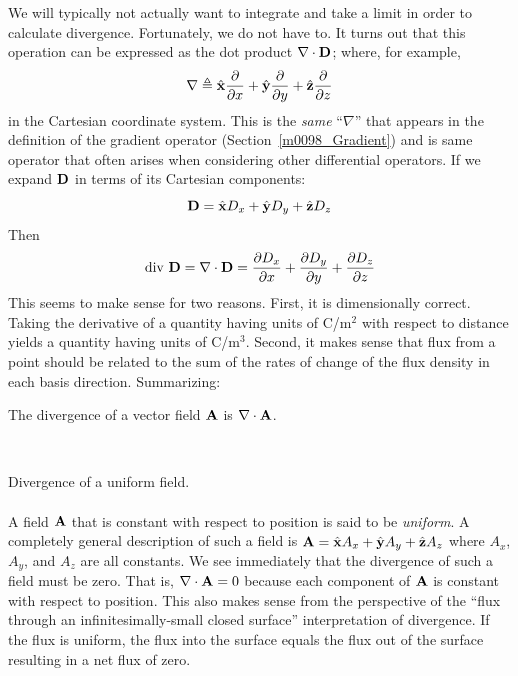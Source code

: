 We will typically not actually want to integrate and take a limit in order to calculate divergence.  
Fortunately, we do not have to.  
It turns out that this operation can be expressed as the dot product $\nabla \cdot {\bf D}$; where, for example,
%
\begin{equation}
\nabla \triangleq \hat{\bf x}\frac{\partial}{\partial x} + \hat{\bf y}\frac{\partial}{\partial y} + \hat{\bf z}\frac{\partial}{\partial z}
\end{equation}
%
in the Cartesian coordinate system.  
This is the \emph{same} ``$\nabla$'' that appears in the definition of the gradient operator (Section~\ref{m0098_Gradient}) and is same operator that often arises when considering other differential operators.
If we expand ${\bf D}$ in terms of its Cartesian components:
%
\begin{equation}
{\bf D} = \hat{\bf x}D_x + \hat{\bf y}D_y + \hat{\bf z}D_z 
\end{equation}
%
Then
%
\begin{equation}
\mbox{div}~{\bf D} = \nabla \cdot {\bf D} = \frac{\partial D_x}{\partial x} + \frac{\partial D_y}{\partial y} + \frac{\partial D_z}{\partial z}
\end{equation}
%
This seems to make sense for two reasons.
First, it is dimensionally correct. Taking the derivative of a quantity having units of C/m$^2$ with respect to distance yields a quantity having units of C/m$^3$.
Second, it makes sense that flux from a point should be related to the sum of the rates of change of the flux density in each basis direction.
Summarizing:
%
\begin{mdframed}[backgroundcolor=yellow!20,nobreak=true] 
The divergence of a vector field ${\bf A}$ is $\nabla\cdot{\bf A}$.
\end{mdframed}

~\\ \begin{example} 
\begin{mdframed}[backgroundcolor=brown!20,linecolor=brown!20]\raggedright
Divergence of a uniform field. 
\\~\\
A field ${\bf A}$ that is constant with respect to position is said to be \emph{uniform}. 
A completely general description of such a field is ${\bf A} = \hat{\bf x}A_x + \hat{\bf y}A_y + \hat{\bf z}A_z$ where $A_x$, $A_y$, and $A_z$ are all constants.  
We see immediately that the divergence of such a field must be zero. That is, $\nabla \cdot {\bf A} = 0$ because each component of ${\bf A}$ is constant with respect to position. 
This also makes sense from the perspective of the ``flux through an infinitesimally-small closed surface'' interpretation of divergence. If the flux is uniform, the flux into the surface equals the flux out of the surface resulting in a net flux of zero.
\end{mdframed}\end{example}

